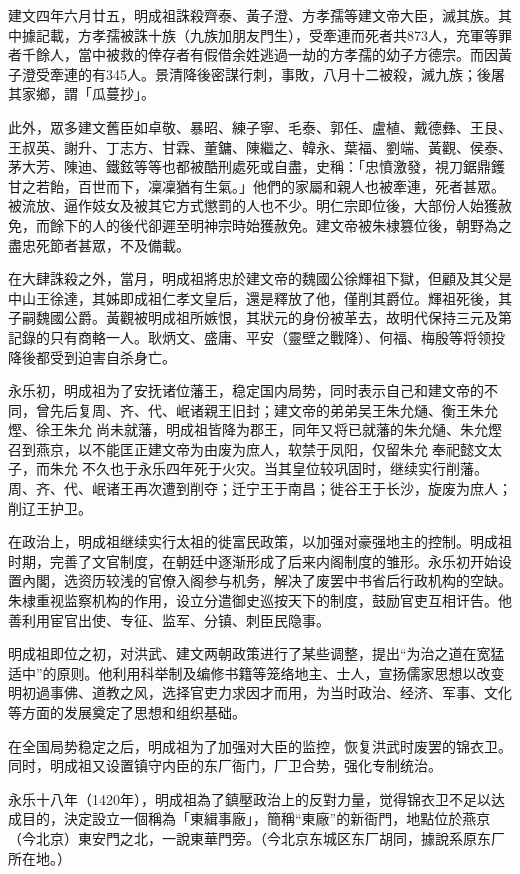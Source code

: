 建文四年六月廿五，明成祖誅殺齊泰、黃子澄、方孝孺等建文帝大臣，滅其族。其中據記載，方孝孺被誅十族（九族加朋友門生），受牽連而死者共873人，充軍等罪者千餘人，當中被救的倖存者有假借余姓逃過一劫的方孝孺的幼子方德宗。而因黃子澄受牽連的有345人。景清降後密謀行刺，事敗，八月十二被殺，滅九族；後屠其家鄉，謂「瓜蔓抄」。

此外，眾多建文舊臣如卓敬、暴昭、練子寧、毛泰、郭任、盧植、戴德彝、王艮、王叔英、謝升、丁志方、甘霖、董鏞、陳繼之、韓永、葉福、劉端、黃觀、侯泰、茅大芳、陳迪、鐵鉉等等也都被酷刑處死或自盡，史稱：「忠憤激發，視刀鋸鼎鑊甘之若飴，百世而下，凜凜猶有生氣。」他們的家屬和親人也被牽連，死者甚眾。被流放、逼作妓女及被其它方式懲罰的人也不少。明仁宗即位後，大部份人始獲赦免，而餘下的人的後代卻遲至明神宗時始獲赦免。建文帝被朱棣篡位後，朝野為之盡忠死節者甚眾，不及備載。

在大肆誅殺之外，當月，明成祖將忠於建文帝的魏國公徐輝祖下獄，但顧及其父是中山王徐達，其姊即成祖仁孝文皇后，還是釋放了他，僅削其爵位。輝祖死後，其子嗣魏國公爵。黃觀被明成祖所嫉恨，其狀元的身份被革去，故明代保持三元及第記錄的只有商輅一人。耿炳文、盛庸、平安（靈壁之戰降）、何福、梅殷等将领投降後都受到迫害自杀身亡。

永乐初，明成祖为了安抚诸位藩王，稳定国内局势，同时表示自己和建文帝的不同，曾先后复周、齐、代、岷诸親王旧封；建文帝的弟弟吴王朱允熥、衡王朱允熞、徐王朱允𤐤尚未就藩，明成祖皆降为郡王，同年又将已就藩的朱允熥、朱允熞召到燕京，以不能匡正建文帝为由废为庶人，软禁于凤阳，仅留朱允𤐤奉祀懿文太子，而朱允𤐤不久也于永乐四年死于火灾。当其皇位较巩固时，继续实行削藩。周、齐、代、岷诸王再次遭到削夺；迁宁王于南昌；徙谷王于长沙，旋废为庶人；削辽王护卫。

在政治上，明成祖继续实行太祖的徙富民政策，以加强对豪强地主的控制。明成祖时期，完善了文官制度，在朝廷中逐渐形成了后来内阁制度的雏形。永乐初开始设置內閣，选资历较浅的官僚入阁参与机务，解决了废罢中书省后行政机构的空缺。朱棣重视监察机构的作用，设立分遣御史巡按天下的制度，鼓励官吏互相讦告。他善利用宦官出使、专征、监军、分镇、刺臣民隐事。

明成祖即位之初，对洪武、建文两朝政策进行了某些调整，提出“为治之道在宽猛适中”的原则。他利用科举制及编修书籍等笼络地主、士人，宣扬儒家思想以改变明初過事佛、道教之风，选择官吏力求因才而用，为当时政治、经济、军事、文化等方面的发展奠定了思想和组织基础。

在全国局势稳定之后，明成祖为了加强对大臣的监控，恢复洪武时废罢的锦衣卫。同时，明成祖又设置镇守内臣的东厂衙门，厂卫合势，强化专制统治。

永乐十八年（1420年），明成祖為了鎮壓政治上的反對力量，觉得锦衣卫不足以达成目的，決定設立一個稱為「東緝事廠」，簡稱“東廠”的新衙門，地點位於燕京（今北京）東安門之北，一說東華門旁。（今北京东城区东厂胡同，據說系原东厂所在地。）


